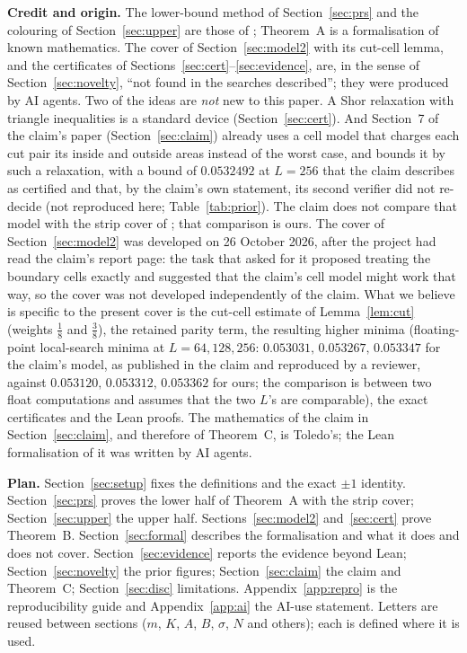 \documentclass[11pt]{amsart}
\theoremstyle{remark}
\begin{document}
\medskip\noindent\textbf{Credit and origin.} The lower-bound method of Section~\ref{sec:prs} and the colouring of Section~\ref{sec:upper} are
those of \cite{PRS08}; Theorem~A is a formalisation of known mathematics. The cover of Section~\ref{sec:model2} with its cut-cell lemma, and the certificates of Sections~\ref{sec:cert}--\ref{sec:evidence}, are, in the sense of
Section~\ref{sec:novelty}, ``not found in the searches described''; they were produced by AI agents.
Two of the ideas are \emph{not} new to this paper. A Shor relaxation with triangle inequalities is a standard device (Section~\ref{sec:cert}). And Section~7 of the claim's paper (Section~\ref{sec:claim}) already uses a cell model that charges each cut pair its inside and outside areas instead of the worst case, and bounds it by such a relaxation, with a bound of $0.0532492$ at $L=256$ that the claim describes as certified and that, by the claim's own statement, its second verifier did not re-decide (not reproduced here; Table~\ref{tab:prior}). The claim does not compare that model with the strip cover of \cite{PRS08}; that comparison is ours. The cover of Section~\ref{sec:model2} was developed on 26 October 2026, after the project had read the claim's report page: the task that asked for it proposed treating the boundary cells exactly and suggested that the claim's cell model might work that way, so the cover was not developed independently of the claim.
What we believe is specific to the present cover is the cut-cell estimate of Lemma~\ref{lem:cut} (weights $\frac18$ and $\frac38$), the retained parity term, the resulting higher minima (floating-point local-search minima at $L=64,128,256$: $0.053031,\,0.053267,\,0.053347$ for the claim's model, as published in the claim and reproduced by a reviewer, against $0.053120,\,0.053312,\,0.053362$ for ours; the comparison is between two float computations and assumes that the two $L$'s are comparable), the exact certificates and the Lean proofs. The mathematics of the
claim in Section~\ref{sec:claim}, and therefore of Theorem~C, is Toledo's; the Lean formalisation of it was written by AI agents.

\medskip\noindent\textbf{Plan.} Section~\ref{sec:setup} fixes the definitions and the exact $\pm1$ identity. Section~\ref{sec:prs} proves
the lower half of Theorem~A with the strip cover; Section~\ref{sec:upper} the upper half. Sections~\ref{sec:model2} and~\ref{sec:cert} prove Theorem~B.
Section~\ref{sec:formal} describes the formalisation and what it does and does not cover. Section~\ref{sec:evidence} reports the evidence
beyond Lean; Section~\ref{sec:novelty} the prior figures; Section~\ref{sec:claim} the claim and Theorem~C; Section~\ref{sec:disc} limitations.
Appendix~\ref{app:repro} is the reproducibility guide and Appendix~\ref{app:ai} the AI-use statement. Letters are reused between sections ($m$, $K$, $A$, $B$, $\sigma$, $N$ and others); each is defined where it is used.
\end{document}
